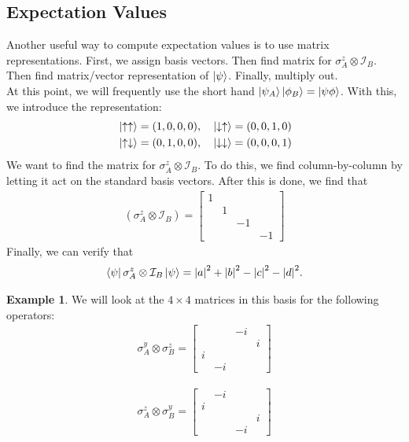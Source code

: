 \documentclass{book}
\theoremstyle{definition}
\newtheorem{exmp}{Example}[section]
\newcommand{\nn}{\nonumber}
\newcommand{\Id}{\mathcal{I}}
\begin{document}
\subsection{Expectation Values}

Another useful way to compute expectation values is to use matrix representations. First, we assign basis vectors. Then find matrix for $\sigma_A^z \otimes \Id_B$. Then find matrix/vector representation of $\ket{\psi}$. Finally, multiply out. \\

At this point, we will frequently use the short hand $\ket{\psi_A}\ket{\phi_B} = \ket{\psi\phi}$. With this, we introduce the representation:
\begin{align}
&\ket{\uparrow\uparrow} = (1,0,0,0), \quad \ket{\downarrow\uparrow} = (0,0,1,0)\nn\\
&\ket{\uparrow\downarrow} = (0,1,0,0), \quad \ket{\downarrow\downarrow} = (0,0,0,1)
\end{align}
We want to find the matrix for $\sigma^z_A \otimes  \Id_B$. To do this, we find column-by-column by letting it act on the standard basis vectors. After this is done, we find that 
\begin{align}
(\sigma_A^z \otimes \Id_B) = \begin{bmatrix}
1 &&&\\
& 1 && \\
&&-1&\\
&&&-1
\end{bmatrix}
\end{align}
Finally, we can verify that
\begin{align}
\bra{\psi} \sigma^z_A \otimes \Id_B \ket{\psi} = \abs{a}^2 + \abs{b}^2 - \abs{c}^2 - \abs{d}^2.
\end{align}


\begin{exmp}
	We will look at the $4\times 4$ matrices in this basis for the following operators:
	\begin{align}
	\sigma_A^y \otimes \sigma_B^z = \begin{bmatrix}
	&&-i&\\
	&&&i\\
	i&&&\\
	&-i&&
	\end{bmatrix}
	\end{align}
	
	\begin{align}
	\sigma^z_A \otimes \sigma^y_B = \begin{bmatrix}
	&-i&& \\
	i&&&\\
	&&&i\\
	&&-i&
	\end{bmatrix}
	\end{align}
\end{exmp}
\end{document}
